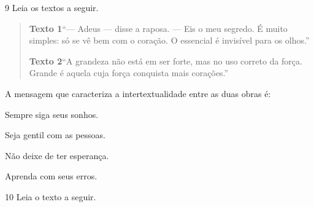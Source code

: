 \num{9} Leia os textos a seguir.

\begin{quote}
\noindent\textbf{Texto 1}\quad ``— Adeus — disse a raposa. — Eis o meu segredo. É muito simples: só se vê bem com o coração. O essencial é invisível para os olhos.''


\noindent\textbf{Texto 2}\quad ``A grandeza não está em ser forte, mas no uso correto da força. Grande é aquela cuja força conquista mais corações.''

\end{quote}

\noindent A mensagem que caracteriza a intertextualidade entre as duas obras é:

\begin{escolha}
\item Sempre siga seus sonhos. 
\item Seja gentil com as pessoas. 
\item Não deixe
de ter esperança. 
\item Aprenda com seus erros.
\end{escolha}



\num{10} Leia o texto a seguir.

